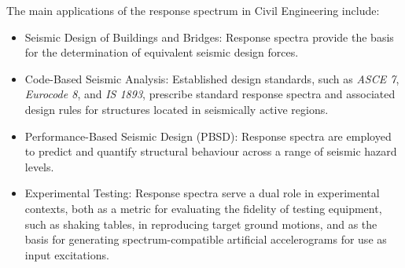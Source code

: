 \documentclass[  10pt, twoside]{report} %
\numberwithin{equation}{chapter}
\begin{document}
The main applications of the response spectrum in Civil Engineering include:
\begin{itemize}[noitemsep, topsep=0pt, leftmargin=*]
    \item Seismic Design of Buildings and Bridges: Response spectra provide the basis for the determination of equivalent seismic design forces.
    \item Code-Based Seismic Analysis: Established design standards, such as \textit{ASCE 7}, \textit{Eurocode 8}, and \textit{IS 1893}, prescribe standard response spectra and associated design rules for structures located in seismically active regions.
    \item Performance-Based Seismic Design (PBSD): Response spectra are employed to predict and quantify structural behaviour across a range of seismic hazard levels.
    \item Experimental Testing: Response spectra serve a dual role in experimental contexts, both as a metric for evaluating the fidelity of testing equipment, such as shaking tables, in reproducing target ground motions, and as the basis for generating spectrum-compatible artificial accelerograms for use as input excitations.
\end{itemize}


\pagebreak
\end{document}
